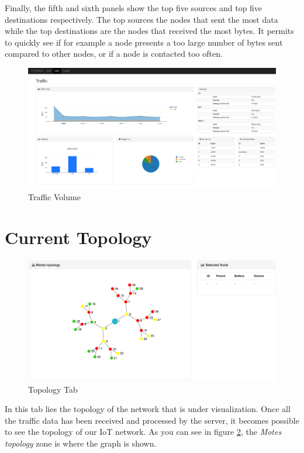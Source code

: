Finally, the fifth and sixth panels show the top five sources and top five destinations respectively. The top sources the nodes that sent the most data while the top destinations are the nodes that received the most bytes. It permits to quickly see if for example a node presents a too large number of bytes sent compared to other nodes, or if a node is contacted too often.

\begin{figure}
	\centering
	\includegraphics[width=\textwidth]{res/traffic.png}
	\caption{Traffic Volume}
	\label{fig:tool_traffic}
\end{figure}

\section{Current Topology}

\begin{figure}[!h]
	\centering
	\includegraphics[width=1.1\textwidth]{res/topologyinterface.png}
	\caption{Topology Tab}
	\label{fig:topo}
\end{figure}

In this tab lies the topology of the network that is under visualization. Once all the traffic data has been received and processed by the server, it becomes possible to see the topology of our IoT network. As you can see in figure \ref{fig:topo}, the \textit{Motes topology} zone is where the graph is shown. \\

